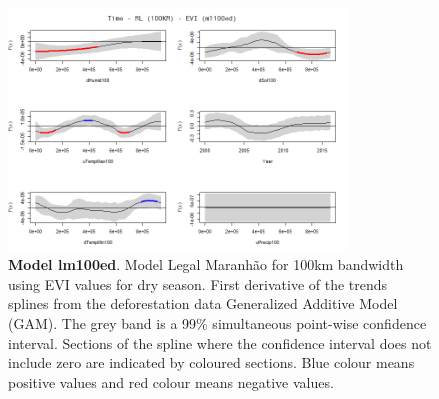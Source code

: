 \begin{table}

\begin{figure}[H]
 \centering
        \centering
        \includegraphics[width=0.8\textwidth]{ml100ed.png} %
        \caption[Model Legal Maranhão for 100km bandwidth using EVI values for dry season. First derivative of the trends splines from the deforestation data Generalized Additive Model (GAM)]{\textbf{Model lm100ed}. Model Legal Maranhão for 100km bandwidth using EVI values for dry season. First derivative of the trends splines from the deforestation data Generalized Additive Model (GAM). The grey band is a 99\% simultaneous point-wise confidence interval. Sections of the spline where the confidence interval does not include zero are indicated by coloured sections. Blue colour means positive values and red colour means negative values.}
        \centering
\end{figure}
\end{table}


